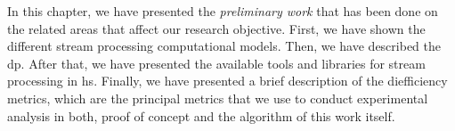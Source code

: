 In this chapter, we have presented the \emph{preliminary work} that has been done on the related areas that affect our research objective.
First, we have shown the different stream processing computational models. Then, we have described the \acrshort{dp}.  
After that, we have presented the available tools and libraries for stream processing in \acrshort{hs}.
Finally, we have presented a brief description of the diefficiency metrics, which are the principal metrics that we use to conduct experimental analysis in both, proof of concept and the algorithm of this work itself.
